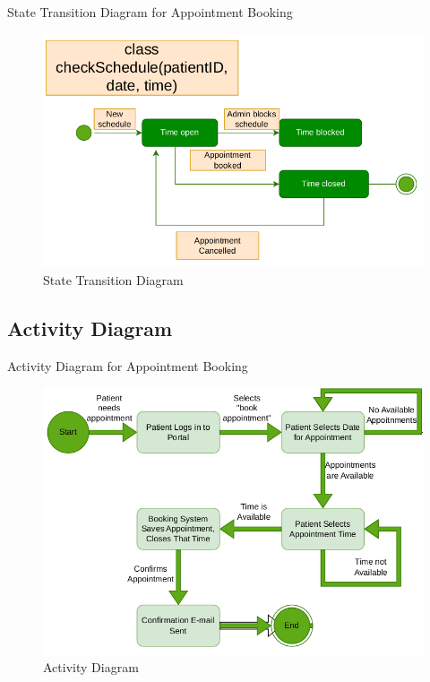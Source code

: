 \documentclass{article}
\begin{document}
\begin{enumerate}
State Transition Diagram for Appointment Booking

\begin{figure}[H]
  \centering
  \includegraphics[width=0.8\linewidth]{../images/state_transition_diagram.png}
  \caption{State Transition Diagram}
\end{figure}

\newpage
\subsection{Activity Diagram}

Activity Diagram for Appointment Booking

\begin{figure}[H]
  \centering
  \includegraphics[width=0.8\linewidth]{../images/activity_diagram.png}
  \caption{Activity Diagram}
\end{figure}


\end{enumerate}
\end{document}
